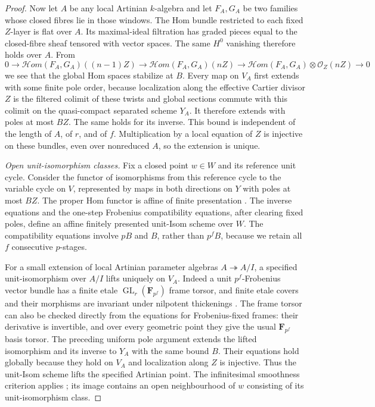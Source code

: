 \begin{proof}
Now let $A$ be any local Artinian $k$-algebra and let $F_A,G_A$ be two
families whose closed fibres lie in those windows. The Hom bundle
restricted to each fixed $Z$-layer is flat over $A$. Its maximal-ideal
filtration has graded pieces equal to the closed-fibre sheaf tensored
with vector spaces. The same $H^0$ vanishing therefore holds over $A$.
From
\[
 0\to\mathcal Hom(F_A,G_A)((n-1)Z)
 \to\mathcal Hom(F_A,G_A)(nZ)
 \to\mathcal Hom(F_A,G_A)\otimes\mathcal O_Z(nZ)\to0
\]
we see that the global Hom spaces stabilize at $B$. Every map on $V_A$
first extends with some finite pole order, because localization along
the effective Cartier divisor $Z$ is the filtered colimit of these
twists and global sections commute with this colimit on the
quasi-compact separated scheme $Y_A$. It therefore extends with poles
at most $BZ$. The same holds for its inverse. This bound is independent
of the length of $A$, of $r$, and of $f$. Multiplication by a local
equation of $Z$ is injective on these bundles, even over nonreduced $A$,
so the extension is unique.

\emph{Open unit-isomorphism classes.}
Fix a closed point $w\in W$ and its reference unit cycle. Consider the
functor of isomorphisms from this reference cycle to the variable cycle
on $V$, represented by maps in both directions on $Y$ with poles at most
$BZ$. The proper Hom functor is affine of finite presentation
\citep[Proposition~99.3.10, Tag~08K6]{C_StacksQuantitativeMonads}.
The inverse equations and the one-step Frobenius compatibility equations,
after clearing fixed poles, define an affine finitely presented unit-Isom
scheme over $W$. The compatibility equations involve $pB$ and $B$,
rather than $p^fB$, because we retain all $f$ consecutive $p$-stages.

For a small extension of local Artinian parameter algebras
$A\twoheadrightarrow A/I$, a specified unit-isomorphism over $A/I$
lifts uniquely on $V_A$. Indeed a unit $p^f$-Frobenius vector bundle has
a finite etale $\operatorname{GL}_r(\mathbf F_{p^f})$ frame torsor,
and finite etale covers and their morphisms are invariant under
nilpotent thickenings
\citep[Lemma~58.8.3, Tag~0BQB]{C_StacksQuantitativeMonads}. The frame
torsor can also be checked directly from the equations for
Frobenius-fixed frames: their derivative is invertible, and over every
geometric point they give the usual $\mathbf F_{p^f}$ basis torsor.
The preceding uniform pole argument extends the lifted isomorphism and
its inverse to $Y_A$ with the same bound $B$. Their equations hold
globally because they hold on $V_A$ and localization along $Z$ is
injective. Thus the unit-Isom scheme lifts the specified Artinian point.
The infinitesimal smoothness criterion applies
\citep[Lemma~10.141.2, Tag~02HT]{C_StacksQuantitativeMonads}; its image
contains an open neighbourhood of $w$ consisting of its unit-isomorphism
class.


\end{proof}
